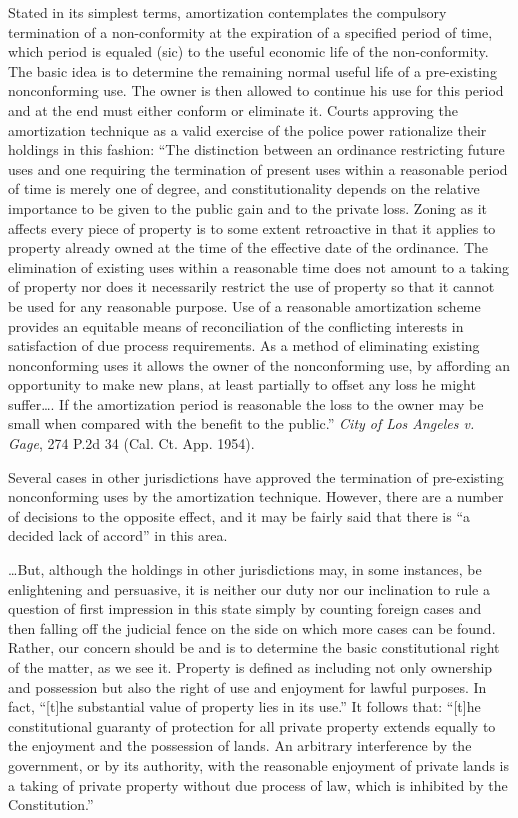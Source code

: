 Stated in its simplest terms, amortization contemplates the compulsory
termination of a non-conformity at the expiration of a specified period of time,
which period is equaled (sic) to the useful economic life of the
non-conformity. The basic idea is to determine the remaining normal useful
life of a pre-existing nonconforming use. The owner is then allowed to continue
his use for this period and at the end must either conform or eliminate it.
Courts approving the amortization technique as a valid exercise of the police
power rationalize their holdings in this fashion: ``The distinction between an
ordinance restricting future uses and one requiring the termination of present
uses within a reasonable period of time is merely one of degree, and
constitutionality depends on the relative importance to be given to the public
gain and to the private loss. Zoning as it affects every piece of property is to
some extent retroactive in that it applies to property already owned at the time
of the effective date of the ordinance. The elimination of existing uses within
a reasonable time does not amount to a taking of property nor does it
necessarily restrict the use of property so that it cannot be used for any
reasonable purpose. Use of a reasonable amortization scheme provides an
equitable means of reconciliation of the conflicting interests in satisfaction
of due process requirements. As a method of eliminating existing nonconforming
uses it allows the owner of the nonconforming use, by affording an opportunity
to make new plans, at least partially to offset any loss he might suffer\ldots .
If the amortization period is reasonable the loss to the owner may be small when
compared with the benefit to the public.'' \emph{City of Los Angeles v. Gage},
274 P.2d 34 (Cal. Ct. App. 1954).

Several cases in other jurisdictions have approved the termination of
pre-existing nonconforming uses by the amortization technique. However, there
are a number of decisions to the opposite effect, and it may be fairly said that
there is ``a decided lack of accord'' in this area. 

\ldots But, although the holdings in other jurisdictions may, in some instances,
be enlightening and persuasive, it is neither our duty nor our inclination to
rule a question of first impression in this state simply by counting foreign
cases and then falling off the judicial fence on the side on which more cases
can be found. Rather, our concern should be and is to determine the basic
constitutional right of the matter, as we see it. Property is defined as
including not only ownership and possession but also the right of use and
enjoyment for lawful purposes. In fact, ``[t]he substantial value of property
lies in its use.'' It follows that: ``[t]he constitutional guaranty of
protection for all private property extends equally to the enjoyment and the
possession of lands. An arbitrary interference by the government, or by its
authority, with the reasonable enjoyment of private lands is a taking of private
property without due process of law, which is inhibited by the Constitution.''

